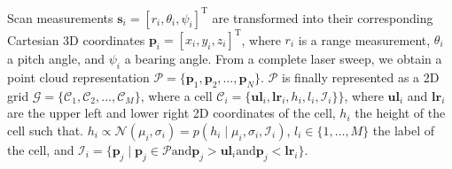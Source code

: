 Scan measurements $\mathbf{s}_i=[r_i,\theta_i,\psi_i]^\text{T}$ are transformed
into their corresponding Cartesian 3D coordinates $\mathbf{p}_i=[x_i,y_i,z_i]
^\text{T}$, where $r_i$ is a range measurement, $\theta_i$ a pitch angle, and
$\psi_i$ a bearing angle. From a complete laser sweep, we obtain a point cloud
representation $\mathcal{P}=\{\mathbf{p}_1,\mathbf{p}_2,\dots,\mathbf{p}_N\}$.
$\mathcal{P}$ is finally represented as a 2D grid $\mathcal{G}=\{\mathcal{C}_1,
\mathcal{C}_2,\dots,\mathcal{C}_M\}$, where a cell $\mathcal{C}_i=
\{\mathbf{ul}_i,\mathbf{lr}_i,h_i,l_i,\mathcal{I}_i\}\}$, where $\mathbf{ul}_i$
and $\mathbf{lr}_i$ are the upper left and lower right 2D coordinates of the
cell, $h_i$ the height of the cell such that. $h_i\propto\mathcal{N}(\mu_i,
\sigma_i)=p(h_i\mid\mu_i,\sigma_i,\mathcal{I}_i)$, $l_i\in\{1,\dots,M\}$ the
label of the cell, and $\mathcal{I}_i=\{\mathbf{p}_j\mid\mathbf{p}_j\in
\mathcal{P}\text{and}\mathbf{p}_j>\mathbf{ul}_i\text{and}\mathbf{p}_j<
\mathbf{lr}_i\}$.
